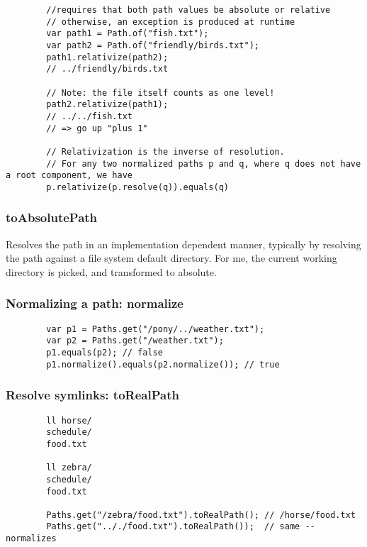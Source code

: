 \documentclass{scrartcl}
\begin{document}
    \begin{lstlisting}
        //requires that both path values be absolute or relative
        // otherwise, an exception is produced at runtime
        var path1 = Path.of("fish.txt");
        var path2 = Path.of("friendly/birds.txt");
        path1.relativize(path2);
        // ../friendly/birds.txt

        // Note: the file itself counts as one level!
        path2.relativize(path1);
        // ../../fish.txt
        // => go up "plus 1"

        // Relativization is the inverse of resolution.
        // For any two normalized paths p and q, where q does not have a root component, we have
        p.relativize(p.resolve(q)).equals(q)
    \end{lstlisting}


\subsubsection{toAbsolutePath}

    Resolves the path in an implementation dependent manner, typically by resolving the path against a file system default directory.
    For me, the current working directory is picked, and transformed to absolute.

\subsubsection{Normalizing a path: normalize}

    \begin{lstlisting}
        var p1 = Paths.get("/pony/../weather.txt");
        var p2 = Paths.get("/weather.txt");
        p1.equals(p2); // false
        p1.normalize().equals(p2.normalize()); // true
    \end{lstlisting}

\subsubsection{Resolve symlinks: toRealPath}

    \begin{lstlisting}
        ll horse/
        schedule/
        food.txt

        ll zebra/
        schedule/
        food.txt

        Paths.get("/zebra/food.txt").toRealPath(); // /horse/food.txt
        Paths.get(".././food.txt").toRealPath());  // same -- normalizes
    \end{lstlisting}
\end{document}
